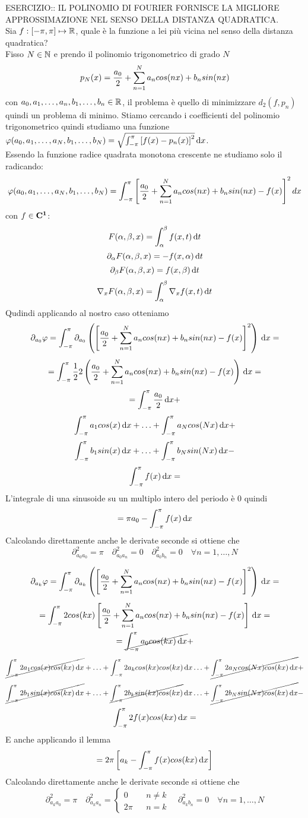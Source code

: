 ESERCIZIO:: IL POLINOMIO DI FOURIER FORNISCE LA MIGLIORE APPROSSIMAZIONE NEL SENSO DELLA DISTANZA QUADRATICA.\\
Sia $f: \left[-\pi,\pi\right] \mapsto \mathbb{R}$, quale è la funzione a lei più vicina nel senso della distanza quadratica?\\
Fisso $N\in\mathbb{N}$ e prendo il polinomio trigonometrico di grado $N$
$$p_N(x)=\frac{a_0}{2}+\sum\limits_{n=1}^{N}a_{n}cos(nx)+b_{n}sin(nx)$$
con $a_0,a_1,\dotsc,a_n,b_1,\dotsc,b_n\in \mathbb{R}$, il problema è quello di minimizzare $d_2(f,p_n)$ quindi un problema di minimo. Stiamo cercando i coefficienti del polinomio trigonometrico quindi studiamo una funzione $\varphi(a_0,a_1,\dotsc,a_N,b_1,\dotsc,b_N) = \sqrt{\int_{-\pi}^{\pi}\left[f(x)-p_n(x)\right]^2}\,\mathrm{d}{x}$.\\
Essendo la funzione radice quadrata monotona crescente ne studiamo solo il radicando:
$$\varphi(a_0,a_1,\dotsc,a_N,b_1,\dotsc,b_N)=\int_{-\pi}^{\pi}\left[\frac{a_0}{2}+\sum\limits_{n=1}^{N}a_{n}cos(nx)+b_{n}sin(nx)-f(x)\right]^2dx$$
\observation
con $f\in \mathbf{C^{1}}$:
$$F(\alpha,\beta,x)=\int_{\alpha}^{\beta}f(x,t)\,\mathrm{d}{t}$$
$$\partial_\alpha F(\alpha,\beta,x)=-f(x,\alpha)\,\mathrm{d}{t}$$
$$\partial_\beta F(\alpha,\beta,x)=f(x,\beta)\,\mathrm{d}{t}$$
$$\nabla_x F(\alpha,\beta,x)=\int_{\alpha}^{\beta}\nabla_xf(x,t)\,\mathrm{d}{t}$$
Qudindi applicando al nostro caso otteniamo
$$\partial_{a_0}\varphi = \int_{-\pi}^{\pi}\partial_{a_0}\left(\left[\frac{a_0}{2}+\sum\limits_{n=1}^{N}a_{n}cos(nx)+b_{n}sin(nx)-f(x)\right]^2\right)\,\mathrm{d}{x}=$$
$$ = \int_{-\pi}^{\pi} \frac{1}{2}2\left(\frac{a_0}{2}+\sum\limits_{n=1}^{N}a_{n}cos(nx)+b_{n}sin(nx)-f(x)\right)\,\mathrm{d}{x}=$$
$$ =  \int_{-\pi}^{\pi} \frac{a_0}{2}\,\mathrm{d}{x} + $$
$$\int_{-\pi}^{\pi} a_1cos(x)\,\mathrm{d}{x} +
\ldots +
\int_{-\pi}^{\pi} a_Ncos(Nx)\,\mathrm{d}{x} + $$
$$\int_{-\pi}^{\pi} b_1sin(x)\,\mathrm{d}{x} +
\ldots +
\int_{-\pi}^{\pi} b_Nsin(Nx)\,\mathrm{d}{x} - $$
$$ \int_{-\pi}^{\pi} f(x)\,\mathrm{d}{x} = $$
L'integrale di una sinusoide su un multiplo intero del periodo è $0$ quindi
$$=\pi a_0-\int_{-\pi}^{\pi}f(x)\,\mathrm{d}{x}$$
Calcolando direttamente anche le derivate seconde si ottiene che
$$\partial^2_{a_0a_0}=\pi\quad\partial^2_{a_0a_n}=0\quad\partial^2_{a_0b_n}=0\quad\forall n=1,\dotsc,N$$

$$\partial_{a_k}\varphi = \int_{-\pi}^{\pi}\partial_{a_k}\left(\left[\frac{a_0}{2}+\sum\limits_{n=1}^{N}a_{n}cos(nx)+b_{n}sin(nx)-f(x)\right]^2\right)\,\mathrm{d}{x}=$$
$$ = \int_{-\pi}^{\pi} 2cos(kx) \left[\frac{a_0}{2}+\sum\limits_{n=1}^{N}a_{n}cos(nx)+b_{n}sin(nx)-f(x)\right]\,\mathrm{d}{x}=$$
$$ =  \cancel{\int_{-\pi}^{\pi} a_0cos(kx)\,\mathrm{d}{x}} + $$
$$\cancel{\int_{-\pi}^{\pi} 2a_1cos(x)cos(kx)\,\mathrm{d}{x}} +
\ldots +
\int_{-\pi}^{\pi} 2a_kcos(kx)cos(kx)\,\mathrm{d}{x}
\ldots +
\cancel{\int_{-\pi}^{\pi} 2a_Ncos(Nx)cos(kx)\,\mathrm{d}{x}} + $$
$$\cancel{\int_{-\pi}^{\pi} 2b_1sin(x)cos(kx)\,\mathrm{d}{x}} +
\ldots +
\cancel{\int_{-\pi}^{\pi} 2b_ksin(kx)cos(kx)}\,\mathrm{d}{x}
\ldots +
\cancel{\int_{-\pi}^{\pi} 2b_Nsin(Nx)cos(kx)\,\mathrm{d}{x}} - $$
$$\int_{-\pi}^{\pi} 2f(x)cos(kx)\,\mathrm{d}{x} = $$
E anche applicando il lemma
$$=2\pi\left[a_k-\int_{-\pi}^{\pi}f(x)cos(kx)\,\mathrm{d}{x}\right]$$
Calcolando direttamente anche le derivate seconde si ottiene che
$$\partial^2_{a_ka_0}=\pi\quad\partial^2_{a_ka_n}=
\left\{\begin{matrix}
0&&n\ne k\\2\pi&&n=k
\end{matrix}\right.
\quad\partial^2_{a_kb_n}=0\quad\forall n=1,\dotsc,N$$

